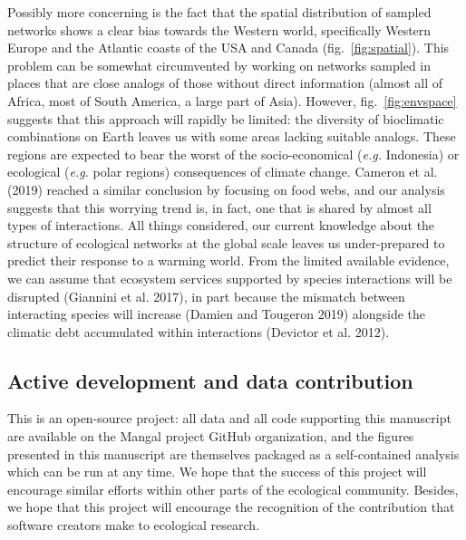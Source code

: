 \documentclass[11pt]{article}
\begin{document}
Possibly more concerning is the fact that the spatial distribution of
sampled networks shows a clear bias towards the Western world,
specifically Western Europe and the Atlantic coasts of the USA and
Canada (fig.~\ref{fig:spatial}). This problem can be somewhat
circumvented by working on networks sampled in places that are close
analogs of those without direct information (almost all of Africa, most
of South America, a large part of Asia). However,
fig.~\ref{fig:envspace} suggests that this approach will rapidly be
limited: the diversity of bioclimatic combinations on Earth leaves us
with some areas lacking suitable analogs. These regions are expected to
bear the worst of the socio-economical (\emph{e.g.} Indonesia) or
ecological (\emph{e.g.} polar regions) consequences of climate change.
Cameron et al. (2019) reached a similar conclusion by focusing on food
webs, and our analysis suggests that this worrying trend is, in fact,
one that is shared by almost all types of interactions. All things
considered, our current knowledge about the structure of ecological
networks at the global scale leaves us under-prepared to predict their
response to a warming world. From the limited available evidence, we can
assume that ecosystem services supported by species interactions will be
disrupted (Giannini et al. 2017), in part because the mismatch between
interacting species will increase (Damien and Tougeron 2019) alongside
the climatic debt accumulated within interactions (Devictor et al.
2012).

\hypertarget{active-development-and-data-contribution}{%
\subsection{Active development and data
contribution}\label{active-development-and-data-contribution}}

This is an open-source project: all data and all code supporting this
manuscript are available on the Mangal project GitHub organization, and
the figures presented in this manuscript are themselves packaged as a
self-contained analysis which can be run at any time. We hope that the
success of this project will encourage similar efforts within other
parts of the ecological community. Besides, we hope that this project
will encourage the recognition of the contribution that software
creators make to ecological research.
\end{document}

